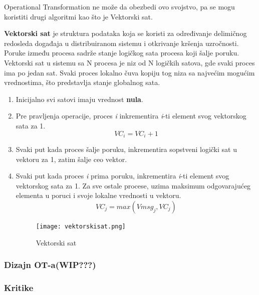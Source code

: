 \documentclass[12pt]{article}
\begin{document}
\begin{itemize}
	      Operational Transformation ne može da obezbedi ovo svojstvo, pa se mogu koristiti drugi algoritmi kao što je Vektorski sat.
	      
	      \textbf{Vektorski sat} je struktura podataka koja se koristi za određivanje delimičnog redosleda događaja u distribuiranom sistemu i otkrivanje kršenja uzročnosti. Poruke između procesa sadrže stanje logičkog sata procesa koji šalje poruku. Vektorski sat u sistemu sa N procesa je niz od N logičkih satova, gde svaki proces ima po jedan sat. Svaki proces lokalno čuva kopiju tog niza sa najvećim mogućim vrednostima, što predstavlja stanje globalnog sata.
	      
	      \begin{enumerate}
	      	\item Inicijalno svi satovi imaju vrednost \textbf{nula}.
	      	\item Pre pravljenja operacije, proces \textit{i} inkrementira \textit{i}-ti element svog vektorskog sata za 1.
	      	      \[ VC_i = VC_i + 1 \]
	      	\item Svaki put kada proces šalje poruku, inkrementira sopstveni logički sat u vektoru za 1, zatim šalje ceo vektor.
	      	\item Svaki put kada proces \textit{i} prima poruku, inkrementira \textit{i}-ti element svog vektorskog sata za 1. Za sve ostale procese, uzima maksimum odgovarajućeg elementa u poruci i svoje lokalne vrednosti u vektoru.
	      	      \[ VC_j = max(Vmsg_j, VC_j)\]
	      	      \begin{figure}[H]
	      	      	\centering
	      	      	\texttt{[image: vektorskisat.png]}
	      	      	\caption{Vektorski sat}
	      	      	\label{fig:nls_demo}
	      	      \end{figure}
	      	                  
	      \end{enumerate}
	      
\end{itemize}

\subsubsection{Dizajn OT-a(WIP???)}

\subsubsection{Kritike}
\end{document}
